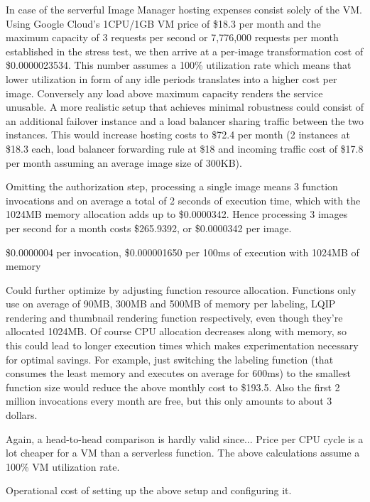 In case of the serverful Image Manager hosting expenses consist solely of the VM. Using Google Cloud's 1CPU/1GB VM price of \$18.3 per month and the maximum capacity of 3 requests per second or 7,776,000 requests per month established in the stress test, we then arrive at a per-image transformation cost of \$0.0000023534. This number assumes a 100\% utilization rate which means that lower utilization in form of any idle periods translates into a higher cost per image. Conversely any load above maximum capacity renders the service unusable. A more realistic setup that achieves minimal robustness could consist of an additional failover instance and a load balancer sharing traffic between the two instances. This would increase hosting costs to \$72.4 per month (2 instances at \$18.3 each, load balancer forwarding rule at \$18 and incoming traffic cost of \$17.8 per month assuming an average image size of 300KB).

Omitting the authorization step, processing a single image means 3 function invocations and on average a total of 2 seconds of execution time, which with the 1024MB memory allocation adds up to \$0.0000342. Hence processing 3 images per second for a month costs \$265.9392, or \$0.0000342 per image.

\$0.0000004 per invocation, \$0.000001650 per 100ms of execution with 1024MB of memory

Could further optimize by adjusting function resource allocation. Functions only use on average of 90MB, 300MB and 500MB of memory per labeling, LQIP rendering and thumbnail rendering function respectively, even though they're allocated 1024MB. Of course CPU allocation decreases along with memory, so this could lead to longer execution times which makes experimentation necessary for optimal savings. For example, just switching the labeling function (that consumes the least memory and executes on average for 600ms) to the smallest function size would reduce the above monthly cost to \$193.5. Also the first 2 million invocations every month are free, but this only amounts to about 3 dollars.

Again, a head-to-head comparison is hardly valid since...
Price per CPU cycle is a lot cheaper for a VM than a serverless function. The above calculations assume a 100\% VM utilization rate.

Operational cost of setting up the above setup and configuring it.
